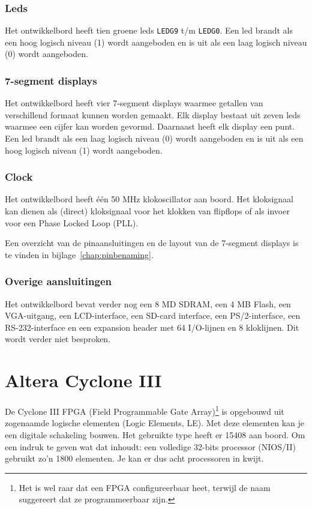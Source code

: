 \documentclass[a4paper,12pt,fleqn,twoside]{book}
\newcommand{\naam}[1]{\texttt{#1}}
\begin{document}
\subsubsection{Leds}
Het ontwikkelbord heeft tien groene leds \naam{LEDG9} t/m \naam{LEDG0}. Een
led brandt als een hoog logisch niveau (1) wordt aangeboden en is uit als een
laag logisch niveau (0) wordt aangeboden.

\subsubsection{7-segment displays}
Het ontwikkelbord heeft vier 7-segment displays waarmee getallen van
verschillend formaat kunnen worden gemaakt. Elk display bestaat uit zeven leds
waarmee een cijfer kan worden gevormd. Daarnaast heeft elk display een punt.
Een led brandt als een laag logisch niveau (0) wordt aangeboden en is uit als
een hoog logisch niveau (1) wordt aangeboden.

\subsubsection{Clock}
Het ontwikkelbord heeft \'{e}\'{e}n 50 MHz klokoscillator aan boord. Het
kloksignaal kan dienen als (direct) kloksignaal voor het klokken van flipflops
of als invoer voor een Phase Locked Loop (PLL).

Een overzicht van de pinaansluitingen en de layout van de 7-segment displays
is te vinden in bijlage~\ref{chap:pinbenaming}.

\subsubsection{Overige aansluitingen}
Het ontwikkelbord bevat verder nog een 8 MD SDRAM, een 4 MB Flash, een
VGA-uitgang, een LCD-interface, een SD-card interface, een PS/2-interface, een
RS-232-interface en een expansion header met 64 I/O-lijnen en 8 kloklijnen. Dit
wordt verder niet besproken.


\section{Altera Cyclone III}
\label{sec:alteracycloneiii}
De Cyclone III FPGA (Field Programmable Gate Array)\footnote{Het is wel raar
dat een FPGA configureerbaar heet, terwijl de naam suggereert dat ze
programmeerbaar zijn.} is opgebouwd uit zogenaamde logische elementen (Logic
Elements, LE). Met deze elementen kan je een digitale schakeling bouwen. Het 
gebruikte type heeft er 15408 aan boord. Om een indruk te geven wat dat
inhoudt: een volledige 32-bits processor (NIOS/II) gebruikt zo'n 1800
elementen. Je kan er dus acht processoren in kwijt.
\end{document}
